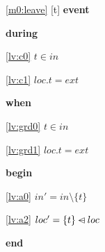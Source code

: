 \noindent \ref{m0:leave} [t] \textbf{event}
\begin{block}
\item \textbf{during}
\begin{block}
\item[ \eqref{lv:c0} ]$t \in in $ %
\item[ \eqref{lv:c1} ]$loc.t = ext $ %
\end{block}
\item \textbf{when}
\begin{block}
\item[ \eqref{lv:grd0} ]$t \in in $ %
\item[ \eqref{lv:grd1} ]$loc.t = ext $ %
\end{block}
\item \textbf{begin}
\begin{block}
\item[ \eqref{lv:a0} ]$in' = in \setminus \{ t \} $ %
\item[ \eqref{lv:a2} ]$loc' = \{ t \} \mathbin{\lhd\mkern-14mu-} loc $ %
\end{block}
\item \textbf{end} \\
\end{block}
